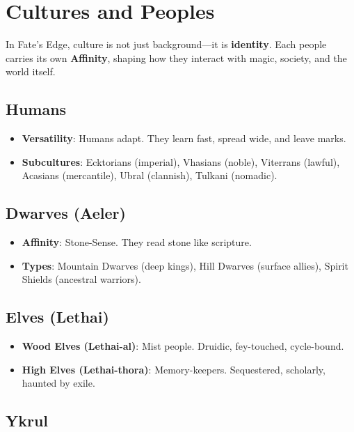 \section*{Cultures and Peoples}

In Fate’s Edge, culture is not just background—it is \textbf{identity}. Each people carries its own \textbf{Affinity}, shaping how they interact with magic, society, and the world itself.

\subsection*{Humans}

\begin{itemize}
    \item \textbf{Versatility}: Humans adapt. They learn fast, spread wide, and leave marks.
    \item \textbf{Subcultures}: Ecktorians (imperial), Vhasians (noble), Viterrans (lawful), Acasians (mercantile), Ubral (clannish), Tulkani (nomadic).
\end{itemize}

\subsection*{Dwarves (Aeler)}

\begin{itemize}
    \item \textbf{Affinity}: Stone-Sense. They read stone like scripture.
    \item \textbf{Types}: Mountain Dwarves (deep kings), Hill Dwarves (surface allies), Spirit Shields (ancestral warriors).
\end{itemize}

\subsection*{Elves (Lethai)}

\begin{itemize}
    \item \textbf{Wood Elves (Lethai-al)}: Mist people. Druidic, fey-touched, cycle-bound.
    \item \textbf{High Elves (Lethai-thora)}: Memory-keepers. Sequestered, scholarly, haunted by exile.
\end{itemize}

\subsection*{Ykrul}

